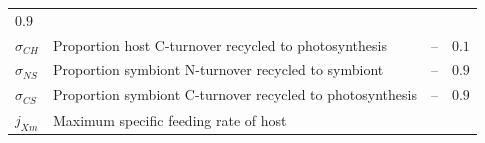 \documentclass[]{elsarticle} %
\begin{document}
\begin{longtable}[]{@{}llll@{}}
\begin{minipage}[t]{0.09\columnwidth}
\(0.9\)\strut
\end{minipage}\tabularnewline
\begin{minipage}[t]{0.09\columnwidth}\raggedright\strut
\(\sigma_{CH}\)\strut
\end{minipage} & \begin{minipage}[t]{0.46\columnwidth}\raggedright\strut
Proportion host C-turnover recycled to photosynthesis\strut
\end{minipage} & \begin{minipage}[t]{0.24\columnwidth}\raggedright\strut
--\strut
\end{minipage} & \begin{minipage}[t]{0.09\columnwidth}\raggedright\strut
\(0.1\)\strut
\end{minipage}\tabularnewline
\begin{minipage}[t]{0.09\columnwidth}\raggedright\strut
\(\sigma_{NS}\)\strut
\end{minipage} & \begin{minipage}[t]{0.46\columnwidth}\raggedright\strut
Proportion symbiont N-turnover recycled to symbiont\strut
\end{minipage} & \begin{minipage}[t]{0.24\columnwidth}\raggedright\strut
--\strut
\end{minipage} & \begin{minipage}[t]{0.09\columnwidth}\raggedright\strut
\(0.9\)\strut
\end{minipage}\tabularnewline
\begin{minipage}[t]{0.09\columnwidth}\raggedright\strut
\(\sigma_{CS}\)\strut
\end{minipage} & \begin{minipage}[t]{0.46\columnwidth}\raggedright\strut
Proportion symbiont C-turnover recycled to photosynthesis\strut
\end{minipage} & \begin{minipage}[t]{0.24\columnwidth}\raggedright\strut
--\strut
\end{minipage} & \begin{minipage}[t]{0.09\columnwidth}\raggedright\strut
\(0.9\)\strut
\end{minipage}\tabularnewline
\begin{minipage}[t]{0.09\columnwidth}\raggedright\strut
\(j_{Xm}\)\strut
\end{minipage} & \begin{minipage}[t]{0.46\columnwidth}\raggedright\strut
Maximum specific feeding rate of host\strut
\end{minipage} & \begin{minipage}[t]{0.24\columnwidth}\raggedright\strut

\end{minipage}
\end{longtable}
\end{document}
